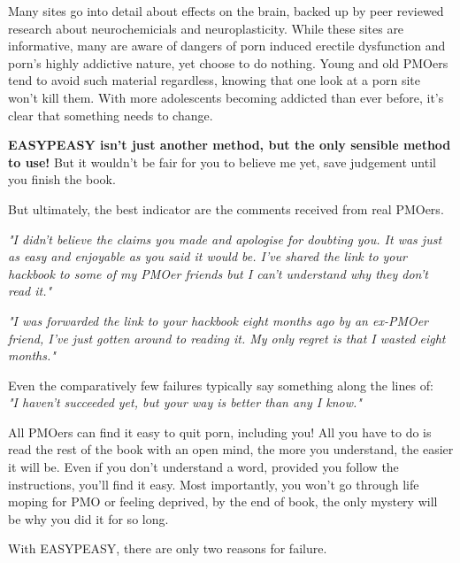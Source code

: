 \documentclass[easypeasy.tex]{subfiles}
\begin{document}
Many sites go into detail about effects on the brain, backed up by peer reviewed research about neurochemicials and neuroplasticity. While these sites are informative, many are aware of dangers of porn induced erectile dysfunction and porn's highly addictive nature, yet choose to do nothing. Young and old PMOers tend to avoid such material regardless, knowing that one look at a porn site won't kill them. With more adolescents becoming addicted than ever before, it's clear that something needs to change.

\textbf{EASYPEASY isn't just another method, but the only sensible method to use!} But it wouldn't be fair for you to believe me yet, save judgement until you finish the book.

But ultimately, the best indicator are the comments received from real PMOers.

\textit{"I didn't believe the claims you made and apologise for doubting you. It was just as easy and enjoyable as you said it would be. I've shared the link to your hackbook to some of my PMOer friends but I can't understand why they don't read it."}

\textit{"I was forwarded the link to your hackbook eight months ago by an ex-PMOer friend, I've just gotten around to reading it. My only regret is that I wasted eight months."}

Even the comparatively few failures typically say something along the lines of:\\ \textit{"I haven't succeeded yet, but your way is better than any I know."}

All PMOers can find it easy to quit porn, including you! All you have to do is read the rest of the book with an open mind, the more you understand, the easier it will be. Even if you don't understand a word, provided you follow the instructions, you'll find it easy. Most importantly, you won't go through life moping for PMO or feeling deprived, by the end of book, the only mystery will be why you did it for so long.

With EASYPEASY, there are only two reasons for failure.
\end{document}
